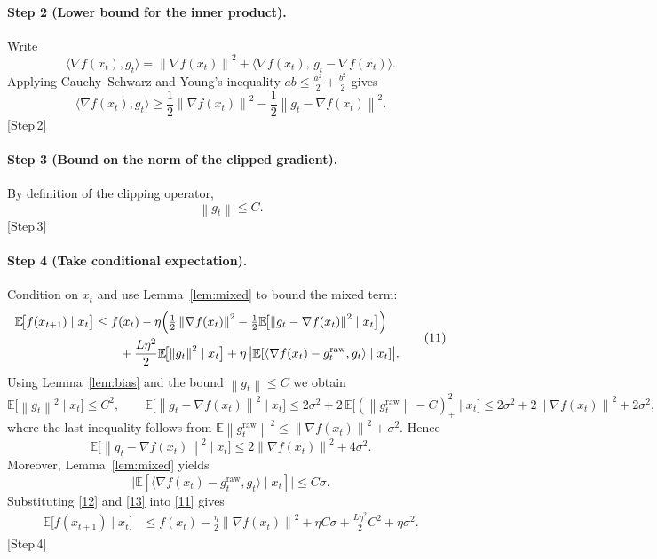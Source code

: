 \documentclass{article}
\newcommand{\norm}[1]{\left\lVert#1\right\rVert}
\newcommand{\E}{\mathbb{E}}
\begin{document}
\paragraph{Step 2 (Lower bound for the inner product).}
Write
\[
\langle\nabla f(x_{t}),g_{t}\rangle
= \norm{\nabla f(x_{t})}^{2}
   +\langle\nabla f(x_{t}),\,g_{t}-\nabla f(x_{t})\rangle .
\]
Applying Cauchy–Schwarz and Young’s inequality $ab\le\frac{a^{2}}{2}+\frac{b^{2}}{2}$
gives
\[
\langle\nabla f(x_{t}),g_{t}\rangle
\ge
\frac{1}{2}\norm{\nabla f(x_{t})}^{2}
-\frac{1}{2}\norm{g_{t}-\nabla f(x_{t})}^{2}.
\tag{9}
\]
[Step 2]

\paragraph{Step 3 (Bound on the norm of the clipped gradient).}
By definition of the clipping operator,
\[
\norm{g_{t}}\le C .
\tag{10}
\]
[Step 3]

\paragraph{Step 4 (Take conditional expectation).}
Condition on $x_{t}$ and use Lemma~\ref{lem:mixed} to bound the mixed term:
\[
\begin{aligned}
\E\!\bigl[f(x_{t+1})\mid x_{t}\bigr]
&\le f(x_{t})
-\eta\Bigl(\tfrac12\norm{\nabla f(x_{t})}^{2}
          -\tfrac12\E\!\bigl[\norm{g_{t}-\nabla f(x_{t})}^{2}\mid x_{t}\bigr]\Bigr) \\
&\qquad
+\frac{L\eta^{2}}{2}\E\!\bigl[\norm{g_{t}}^{2}\mid x_{t}\bigr]
+\eta\,\bigl|\E[\langle\nabla f(x_{t})-g^{\text{raw}}_{t},g_{t}\rangle\mid x_{t}]\bigr| .
\end{aligned}
\tag{11}
\]
Using Lemma~\ref{lem:bias} and the bound $\norm{g_{t}}\le C$ we obtain
\[
\E\!\bigl[\norm{g_{t}}^{2}\mid x_{t}\bigr]\le C^{2},
\qquad
\E\!\bigl[\norm{g_{t}-\nabla f(x_{t})}^{2}\mid x_{t}\bigr]
\le 2\sigma^{2}+2\,\E\!\bigl[(\norm{g^{\text{raw}}_{t}}-C)_{+}^{2}\mid x_{t}\bigr]
\le 2\sigma^{2}+2\norm{\nabla f(x_{t})}^{2}+2\sigma^{2},
\]
where the last inequality follows from $\E\norm{g^{\text{raw}}_{t}}^{2}
\le \norm{\nabla f(x_{t})}^{2}+\sigma^{2}$.
Hence
\[
\E\!\bigl[\norm{g_{t}-\nabla f(x_{t})}^{2}\mid x_{t}\bigr]
\le 2\norm{\nabla f(x_{t})}^{2}+4\sigma^{2}.
\tag{12}
\]
Moreover, Lemma~\ref{lem:mixed} yields
\[
\bigl|\E[\langle\nabla f(x_{t})-g^{\text{raw}}_{t},g_{t}\rangle\mid x_{t}]\bigr|
\le C\sigma .
\tag{13}
\]
Substituting \eqref{12} and \eqref{13} into \eqref{11} gives
\[
\begin{aligned}
\E\!\bigl[f(x_{t+1})\mid x_{t}\bigr]
&\le f(x_{t})
-\frac{\eta}{2}\norm{\nabla f(x_{t})}^{2}
+\eta C\sigma
+\frac{L\eta^{2}}{2}C^{2}
+ \eta\sigma^{2}.
\end{aligned}
\tag{14}
\]
[Step 4]
\end{document}
